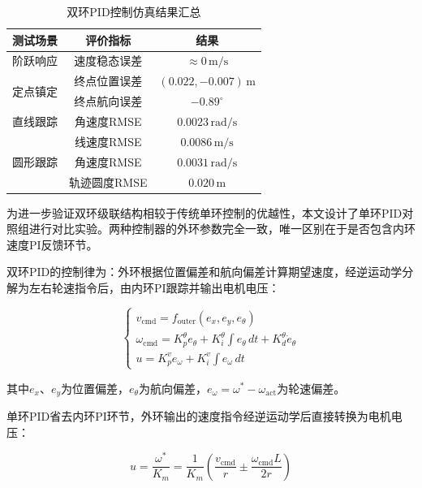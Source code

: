 {{    \begin{table}[htbp]
    \wuhao
    \centering
    \caption{双环PID控制仿真结果汇总}
    \label{tab:pid_sim_summary}
    \begin{tabular}{ccc}
    \toprule
    测试场景 & 评价指标 & 结果 \\
    \midrule
    阶跃响应 & 速度稳态误差 & $\approx 0\,\mathrm{m/s}$ \\
    \multirow{2}{*}{定点镇定} & 终点位置误差 & $(0.022, -0.007)\,\mathrm{m}$ \\
    & 终点航向误差 & $-0.89^\circ$ \\
    直线跟踪 & 角速度RMSE & $0.0023\,\mathrm{rad/s}$ \\
    \multirow{3}{*}{圆形跟踪} & 线速度RMSE & $0.0086\,\mathrm{m/s}$ \\
    & 角速度RMSE & $0.0031\,\mathrm{rad/s}$ \\
    & 轨迹圆度RMSE & $0.020\,\mathrm{m}$ \\
    \bottomrule
    \end{tabular}
    \end{table}

    为进一步验证双环级联结构相较于传统单环控制的优越性，本文设计了单环PID对照组进行对比实验。两种控制器的外环参数完全一致，唯一区别在于是否包含内环速度PI反馈环节。

    双环PID的控制律为：外环根据位置偏差和航向偏差计算期望速度，经逆运动学分解为左右轮速指令后，由内环PI跟踪并输出电机电压：

    \begin{equation}
    \begin{cases}
    v_{\mathrm{cmd}} = f_{\mathrm{outer}}(e_x, e_y, e_\theta) \\
    \omega_{\mathrm{cmd}} = K_p^\theta e_\theta + K_i^\theta \int e_\theta\,dt + K_d^\theta \dot{e}_\theta \\
    u = K_p^v e_\omega + K_i^v \int e_\omega\,dt
    \end{cases}
    \label{eq:dual_loop}
    \end{equation}

    其中$e_x$、$e_y$为位置偏差，$e_\theta$为航向偏差，$e_\omega = \omega^* - \omega_{\mathrm{act}}$为轮速偏差。

    单环PID省去内环PI环节，外环输出的速度指令经逆运动学后直接转换为电机电压：

    \begin{equation}
    u = \frac{\omega^*}{K_m} = \frac{1}{K_m}\left(\frac{v_{\mathrm{cmd}}}{r} \pm \frac{\omega_{\mathrm{cmd}} L}{2r}\right)
    \label{eq:single_loop}
    \end{equation}

}}
